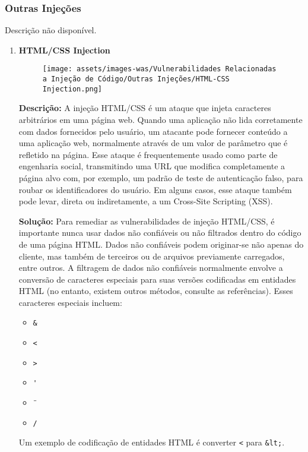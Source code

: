 \documentclass[a4paper,12pt]{article}
\begin{document}
\subsubsection{Outras Injeções}
Descrição não disponível.

\begin{enumerate}
\item \textbf{HTML/CSS Injection}

                        \begin{figure}[h!]
                        \centering
                        \texttt{[image: assets/images-was/Vulnerabilidades Relacionadas a Injeção de Código/Outras Injeções/HTML-CSS Injection.png]}
                        \end{figure}
                        \FloatBarrier
                        \textbf{Descrição:}  A injeção HTML/CSS é um ataque que injeta caracteres arbitrários em uma página web. Quando uma aplicação não lida corretamente com dados fornecidos pelo usuário, um atacante pode fornecer conteúdo a uma aplicação web, normalmente através de um valor de parâmetro que é refletido na página. Esse ataque é frequentemente usado como parte de engenharia social, transmitindo uma URL que modifica completamente a página alvo com, por exemplo, um padrão de teste de autenticação falso, para roubar os identificadores do usuário. Em alguns casos, esse ataque também pode levar, direta ou indiretamente, a um Cross-Site Scripting (XSS).


\textbf{Solução:} Para remediar as vulnerabilidades de injeção HTML/CSS, é importante nunca usar dados não confiáveis ou não filtrados dentro do código de uma página HTML.
Dados não confiáveis podem originar-se não apenas do cliente, mas também de terceiros ou de arquivos previamente carregados, entre outros.
A filtragem de dados não confiáveis normalmente envolve a conversão de caracteres especiais para suas versões codificadas em entidades HTML (no entanto, existem outros métodos, consulte as referências). Esses caracteres especiais incluem:
\begin{itemize}
    \item \texttt{\&}
    \item \texttt{<}
    \item \texttt{>}
    \item \texttt{\'}
    \item \texttt{\"}
    \item \texttt{/}
\end{itemize}
Um exemplo de codificação de entidades HTML é converter \texttt{<} para \texttt{\&lt;}.


\end{enumerate}
\end{document}
